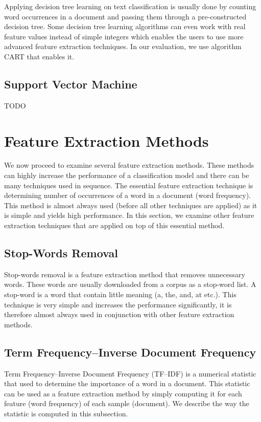 Applying decision tree learning on text classification is usually done by counting word occurrences in a document and passing them through a pre-constructed decision tree. Some decision tree learning algorithms can even work with real feature values instead of simple integers which enables the users to use more advanced feature extraction techniques. In our evaluation, we use algorithm CART that enables it.

\subsection{Support Vector Machine}

TODO

\section{Feature Extraction Methods}

We now proceed to examine several feature extraction methods. These methods can highly increase the performance of a classification model and there can be many techniques used in sequence. The essential feature extraction technique is determining number of occurrences of a word in a document (word frequency). This method is almost always used (before all other techniques are applied) as it is simple and yields high performance. In this section, we examine other feature extraction techniques that are applied on top of this essential method.

\subsection{Stop-Words Removal}

Stop-words removal is a feature extraction method that removes unnecessary words. These words are usually downloaded from a corpus as a stop-word list. A stop-word is a word that contain little meaning (a, the, and, at etc.). This technique is very simple and increases the performance significantly, it is therefore almost always used in conjunction with other feature extraction methods. 

\subsection{Term Frequency--Inverse Document Frequency}

Term Frequency--Inverse Document Frequency (TF--IDF) is a numerical statistic that used to determine the importance of a word in a document. This statistic can be used as a feature extraction method by simply computing it for each feature (word frequency) of each sample (document). We describe the way the statistic is computed in this subsection.

